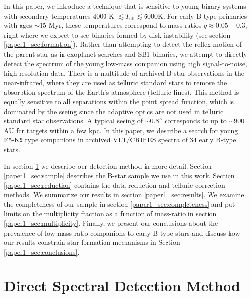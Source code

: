 In this paper, we introduce a technique that is sensitive to young binary
systems with secondary temperatures $4000$ K $\lesssim T_\mathrm{eff} \lesssim
6000 $K. For early B-type primaries with ages $\sim 15$ Myr, these
temperatures correspond to mass-ratios $q \approx 0.05-0.3$, right
where we expect to see binaries formed by disk instability (see
section \ref{paper1_sec:formation}). Rather
than attempting to detect the reflex motion of the parent
star as in exoplanet searches and SB1 binaries, we attempt to directly
detect the spectrum of the young low-mass companion using high
signal-to-noise, high-resolution data. There is a multitude of archived B-star observations in the near-infrared,
where they are used as telluric standard stars to remove the absorption spectrum of the Earth's atmosphere (telluric
lines). This method is equally sensitive to all separations within the point spread function, which is dominated by the seeing since the adaptive optics are not used in telluric standard star observations. A typical seeing of $\sim 0.8''$ corresponds to up to $\sim 900$ AU for targets within a few kpc. In this paper, we describe a search for young F5-K9 type companions in archived VLT/CRIRES spectra of 34 early B-type stars.

In section \ref{paper1_sec:newmethod} we describe our detection method in 
more detail. Section \ref{paper1_sec:sample} describes the B-star sample we use in this work.
Section \ref{paper1_sec:reduction} contains the data reduction and telluric correction methods. 
We summarize our results in section \ref{paper1_sec:results}. We examine the
completeness of our sample in section \ref{paper1_sec:completeness} and put
limits on the multiplicity fraction as a function of mass-ratio in
section \ref{paper1_sec:multiplicity}. Finally, we present our conclusions about the prevalence of low mass-ratio companions to early B-type stars and discuss how our results constrain star formation mechanisms in Section \ref{paper1_sec:conclusions}.


\section{Direct Spectral Detection Method}
\label{paper1_sec:newmethod}

